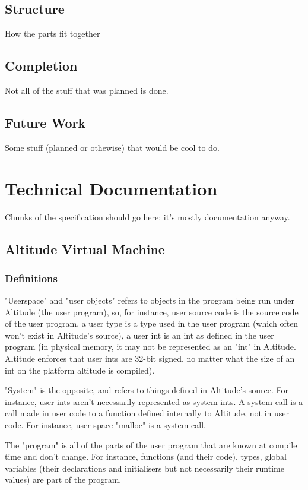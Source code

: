 \documentclass[10pt,a4paper]{report}
\begin{document}
\section{Structure}
How the parts fit together
\section{Completion}
Not all of the stuff that was planned is done.

\section{Future Work}
Some stuff (planned or othewise) that would be cool to do.

\chapter{Technical Documentation}
Chunks of the specification should go here; it's mostly documentation anyway.

\section{Altitude Virtual Machine}

\subsection{Definitions}
"Userspace" and "user objects" refers to objects in the program being run under Altitude (the user program), so, for instance, user source code is the source code of the user program, a user type is a type used in the user program (which often won't exist in Altitude's source), a user int is an int as defined in the user program (in physical memory, it may not be represented as an "int" in Altitude. Altitude enforces that user ints are 32-bit signed, no matter what the size of an int on the platform altitude is compiled).

"System" is the opposite, and refers to things defined in Altitude's source. For instance, user ints aren't necessarily represented as system ints. A system call is a call made in user code to a function defined internally to Altitude, not in user code. For instance, user-space "malloc" is a system call.

The "program" is all of the parts of the user program that are known at compile time and don't change. For instance, functions (and their code), types, global variables (their declarations and initialisers but not necessarily their runtime values) are part of the program.
\end{document}
